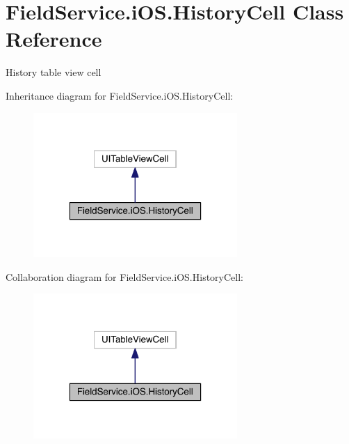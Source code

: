 \hypertarget{class_field_service_1_1i_o_s_1_1_history_cell}{\section{Field\+Service.\+i\+O\+S.\+History\+Cell Class Reference}
\label{class_field_service_1_1i_o_s_1_1_history_cell}
}


History table view cell  




Inheritance diagram for Field\+Service.\+i\+O\+S.\+History\+Cell\+:
\nopagebreak
\begin{figure}[H]
\begin{center}
\leavevmode
\includegraphics[width=220pt]{class_field_service_1_1i_o_s_1_1_history_cell__inherit__graph}
\end{center}
\end{figure}


Collaboration diagram for Field\+Service.\+i\+O\+S.\+History\+Cell\+:
\nopagebreak
\begin{figure}[H]
\begin{center}
\leavevmode
\includegraphics[width=220pt]{class_field_service_1_1i_o_s_1_1_history_cell__coll__graph}
\end{center}
\end{figure}
